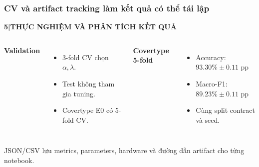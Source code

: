 \documentclass[aspectratio=169,12pt]{beamer}
\newcommand{\chaptertag}[2]{%
  \vspace{-0.16cm}%
  {\scriptsize\bfseries\textcolor{boxframe}{#1\enspace |\enspace #2}}\par
  \vspace{0.12cm}%
}
\begin{document}
\begin{frame}
  \frametitle{CV và artifact tracking làm kết quả có thể tái lập}
  \chaptertag{5}{THỰC NGHIỆM VÀ PHÂN TÍCH KẾT QUẢ}
  \begin{columns}[T,onlytextwidth]
      \textbf{Validation}
      \begin{itemize}
        \item 3-fold CV chọn $\alpha,\lambda$.
        \item Test không tham gia tuning.
        \item Covertype E0 có 5-fold CV.
      \end{itemize}
      \textbf{Covertype 5-fold}
      \begin{itemize}
        \item Accuracy: $93.30\%\pm0.11$ pp
        \item Macro-F1: $89.23\%\pm0.11$ pp
        \item Cùng split contract và seed.
      \end{itemize}
  \end{columns}
  \vspace{0.28cm}
  \centering
  JSON/CSV lưu metrics, parameters, hardware và đường dẫn artifact cho từng notebook.
\end{frame}
\end{document}
